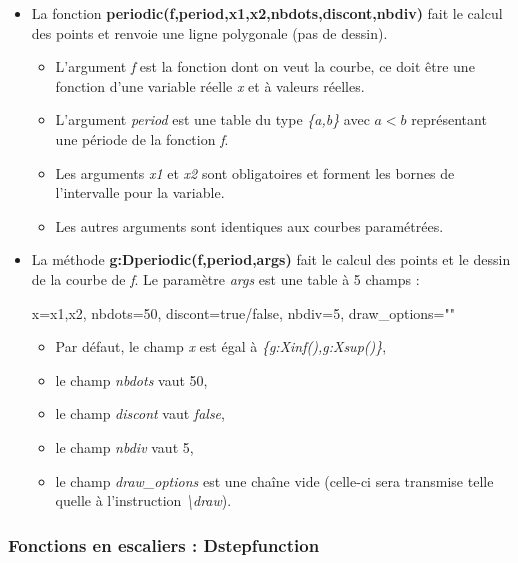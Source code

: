 \documentclass[%
10pt,%
a4paper,%
french,%
]%
{article}%
\begin{document}
\begin{itemize}
\item La fonction \textbf{periodic(f,period,x1,x2,nbdots,discont,nbdiv)} fait le calcul des points et renvoie une ligne polygonale (pas de dessin).

  \begin{itemize}
    \item L'argument \emph{f} est la fonction dont on veut la courbe, ce doit être une fonction d'une variable réelle \emph{x} et à valeurs réelles.
    \item L'argument \emph{period} est une table du type \emph{\{a,b\}} avec \(a<b\) représentant une période de la fonction \emph{f}.
    \item Les arguments \emph{x1} et \emph{x2} sont obligatoires et forment les bornes de l'intervalle pour la variable.
    \item Les autres arguments sont identiques aux courbes paramétrées.
  \end{itemize}
\item La méthode \textbf{g:Dperiodic(f,period,args)} fait le calcul des points et le dessin de la courbe de \emph{f}. Le paramètre \emph{args} est une table à 5 champs :

\begin{TeXcode}
  { x={x1,x2}, nbdots=50, discont=true/false, nbdiv=5, draw_options="" }
\end{TeXcode}

  \begin{itemize}
      \item Par défaut, le champ \emph{x} est égal à \emph{\{g:Xinf(),g:Xsup()\}},
      \item le champ \emph{nbdots} vaut 50, 
      \item le champ \emph{discont} vaut \emph{false}, 
      \item le champ \emph{nbdiv} vaut 5, 
      \item le champ \emph{draw\_options} est une chaîne vide (celle-ci sera transmise telle quelle à l'instruction \emph{\textbackslash draw}).
  \end{itemize}

\end{itemize}

\subsubsection{Fonctions en escaliers : Dstepfunction}
\end{document}
